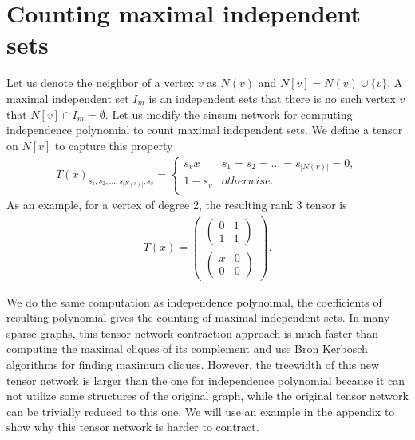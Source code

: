 \documentclass{article}
\newcommand{\<}{\langle}
\renewcommand{\>}{\rangle}
\theoremstyle{definition}\newtheorem{definition}{\textit{Definition}}
\begin{document}
\section{Counting maximal independent sets}
Let us denote the neighbor of a vertex $v$ as $N(v)$ and $N[v] = N(v)\cup \{v\}$.
A maximal independent set $I_m$ is an independent sets that there is no such vertex $v$ that $N[v] \cap I_m = \emptyset$.
Let us modify the einsum network for computing independence polynomial to count maximal independent sets.
We define a tensor on $N[v]$ to capture this property
\begin{align}
    T(x)_{s_1,s_2,\ldots,s_{|N(v)|},s_v} = \begin{cases}
        s_vx & s_1=s_2=\ldots=s_{|N(v)|}=0,\\
        1-s_v& otherwise.\\
    \end{cases}
\end{align}
As an example, for a vertex of degree 2, the resulting rank 3 tensor is
\begin{align}
    T(x)=\left(\begin{matrix}
    \left(\begin{matrix}
        0 &1 \\
        1 &1
    \end{matrix}\right)\\
    \left(\begin{matrix}
        x &0 \\
        0 &0
    \end{matrix}\right)
    \end{matrix}\right).
\end{align}

We do the same computation as independence polynoimal, the coefficients of resulting polynomial gives the counting of maximal independent sets.
In many sparse graphs, this tensor network contraction approach is much faster than computing the maximal cliques of its complement and use Bron Kerbosch algorithms for finding maximum cliques.
However, the treewidth of this new tensor network is larger than the one for independence polynomial because it can not utilize some structures of the original graph,
while the original tensor network can be trivially reduced to this one.
We will use an example in the appendix to show why this tensor network is harder to contract.
\end{document}
